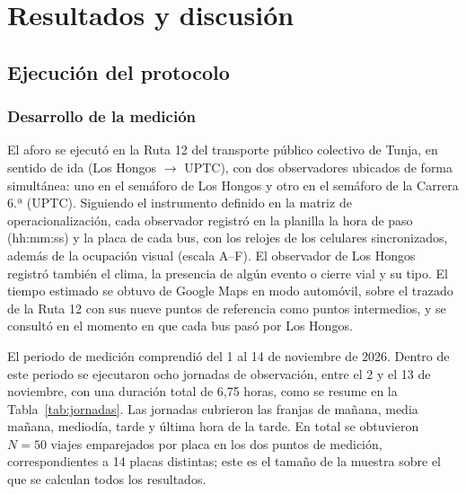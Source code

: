 \section{Resultados y discusión}

\subsection{Ejecución del protocolo}

\subsubsection{Desarrollo de la medición}

El aforo se ejecutó en la Ruta 12 del transporte público colectivo de Tunja, en sentido de ida (Los Hongos $\rightarrow$ UPTC), con dos observadores ubicados de forma simultánea: uno en el semáforo de Los Hongos y otro en el semáforo de la Carrera 6.ª (UPTC). Siguiendo el instrumento definido en la matriz de operacionalización, cada observador registró en la planilla la hora de paso (hh:mm:ss) y la placa de cada bus, con los relojes de los celulares sincronizados, además de la ocupación visual (escala A--F). El observador de Los Hongos registró también el clima, la presencia de algún evento o cierre vial y su tipo. El tiempo estimado se obtuvo de Google Maps en modo automóvil, sobre el trazado de la Ruta 12 con sus nueve puntos de referencia como puntos intermedios, y se consultó en el momento en que cada bus pasó por Los Hongos.

El periodo de medición comprendió del 1 al 14 de noviembre de 2026. Dentro de este periodo se ejecutaron ocho jornadas de observación, entre el 2 y el 13 de noviembre, con una duración total de 6,75 horas, como se resume en la Tabla~\ref{tab:jornadas}. Las jornadas cubrieron las franjas de mañana, media mañana, mediodía, tarde y última hora de la tarde. En total se obtuvieron $N = 50$ viajes emparejados por placa en los dos puntos de medición, correspondientes a 14 placas distintas; este es el tamaño de la muestra sobre el que se calculan todos los resultados.

